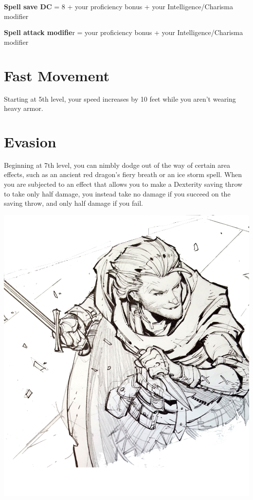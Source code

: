 \begin{multicols*}{2}
\textbf{Spell save DC} = 8 + your proficiency bonus + your Intelligence/Charisma modifier

\textbf{Spell attack modifie}r = your proficiency bonus + your Intelligence/Charisma modifier


\section*{Fast Movement}

Starting at 5th level, your speed increases by 10 feet while you aren’t wearing heavy armor.


\section*{Evasion}

Beginning at 7th level, you can nimbly dodge out of the way of certain area effects, such as an ancient red dragon’s fiery breath or an ice storm spell. When you are subjected to an effect that allows you to make a Dexterity saving throw to take only half damage, you instead take no damage if you succeed on the saving throw, and only half damage if you fail.

    

\begin{Figure}
\centering
\includegraphics[width=\textwidth]{img/trickster.png}
\end{Figure}
    
\end{multicols*}

\clearpage






    

